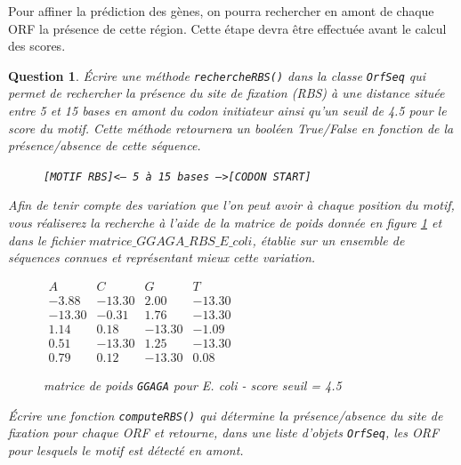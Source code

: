 \documentclass[10pt]{article}
\newtheorem{question}{Question}
\begin{document}
Pour affiner la prédiction des gènes, on pourra rechercher en amont de chaque ORF la présence de cette région. Cette étape devra être effectuée avant le calcul des scores.

\begin{question}
Écrire une méthode {\tt rechercheRBS()} dans la classe {\tt OrfSeq} qui permet de rechercher la présence du site de fixation (RBS) à une distance située entre 5 et 15 bases en amont du codon initiateur ainsi qu'un seuil de 4.5 pour le score du motif. Cette méthode retournera un booléen True/False en fonction de la présence/absence de cette séquence.

\begin{figure}[ht]
\centering
{\tt [MOTIF\ RBS]<--\ 5\ à\ 15\ bases\ -->[CODON\ START]}
\end{figure}

Afin de tenir compte des variation que l'on peut avoir à chaque position du motif, vous réaliserez la recherche à l'aide de la matrice de poids donnée en figure \ref{fig:matr_ggagg} et dans le fichier {\tt $matrice\_GGAGA\_RBS\_E\_coli$}, établie sur un ensemble de séquences connues et représentant mieux cette variation.
\begin{figure}[ht]
\centering
$
\begin{matrix}
A & C & G & T\\
-3.88 & -13.30 & 2.00 & -13.30\\
-13.30 & -0.31 & 1.76 & -13.30\\
1.14 & 0.18 & -13.30 & -1.09\\
0.51 & -13.30 & 1.25 & -13.30\\
0.79 & 0.12 & -13.30 & 0.08
\end{matrix}
$
\caption{matrice de poids {\tt GGAGA} pour E. coli - score seuil = 4.5}
\label{fig:matr_ggagg}
\end{figure}

Écrire une fonction {\tt computeRBS()} qui détermine la présence/absence du site de fixation pour chaque ORF et retourne, dans une liste d'objets {\tt OrfSeq}, les ORF pour lesquels le motif est détecté en amont. 

\end{question}
\end{document}
